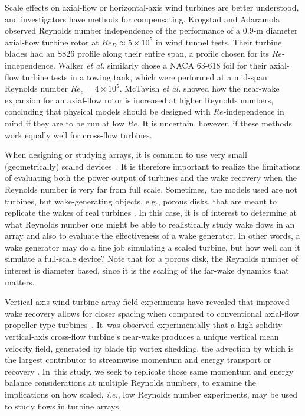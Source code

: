 \documentclass[energies,article,accept,moreauthors,pdftex,10pt,a4paper]{mdpi}
\theoremstyle{mdpi}
\newcounter{ex}
\newcounter{re}
\begin{document}
Scale effects on axial-flow or horizontal-axis wind turbines are better
understood, and investigators have methods for compensating. Krogstad and
Adaramola \cite{Krogstad2012a} observed Reynolds number independence of the
performance of a 0.9-m diameter axial-flow turbine rotor at $Re_D \approx 5
\times 10^5$ in wind tunnel tests. Their turbine blades had an S826 profile
along their entire span, a profile chosen for its $Re$-independence. Walker \emph{et
al.} \cite{Walker2014} similarly chose a NACA 63-618 foil for their axial-flow
turbine tests in a towing tank, which were performed at a mid-span Reynolds
number $Re_c = 4 \times 10^5$. McTavish \emph{et al.} \cite{McTavish2013} showed how
the near-wake expansion for an axial-flow rotor is increased at higher Reynolds
numbers, concluding that physical models should be designed with
$Re$-independence in mind if they are to be run at low $Re$. It is uncertain,
however, if these methods work equally well for cross-flow turbines.

When designing or studying arrays, it is common to use very small
(geometrically) scaled \mbox{devices \cite{Chamorro2011, Chamorro2011b}}. It is
therefore important to realize the limitations of evaluating both the power
output of turbines and the wake recovery when the Reynolds number is very far from
full scale. Sometimes,~the models used are not turbines, but wake-generating objects,
e.g., porous disks, that are meant to replicate the wakes of real turbines
\cite{Goldenberg1983}. In this case, it is of interest to determine at what
Reynolds number one might be able to realistically study wake flows in an array
and also to evaluate the effectiveness of a wake generator. In other words, a
wake generator may do a fine job simulating a scaled turbine, but how well can
it simulate a full-scale device? Note that for a porous disk, the Reynolds
number of interest is diameter based, since it is the scaling of the far-wake
dynamics that~ matters.

Vertical-axis wind turbine array field experiments have revealed that improved
wake recovery allows for closer spacing when compared to conventional axial-flow
propeller-type \mbox{turbines \cite{Dabiri2011, Kinzel2012}}. It~was observed
experimentally that a high solidity vertical-axis cross-flow turbine's near-wake
produces a unique vertical mean velocity field, generated by blade tip vortex
shedding, the advection by which is the largest contributor to streamwise
momentum and energy transport or recovery \cite{Bachant2015-JoT}. In~this study,
we seek to replicate those same momentum and energy balance considerations at
multiple Reynolds numbers, to examine the implications on how scaled, \emph{i.e.}, low
Reynolds number experiments, may be used to study flows in turbine arrays.
\end{document}
